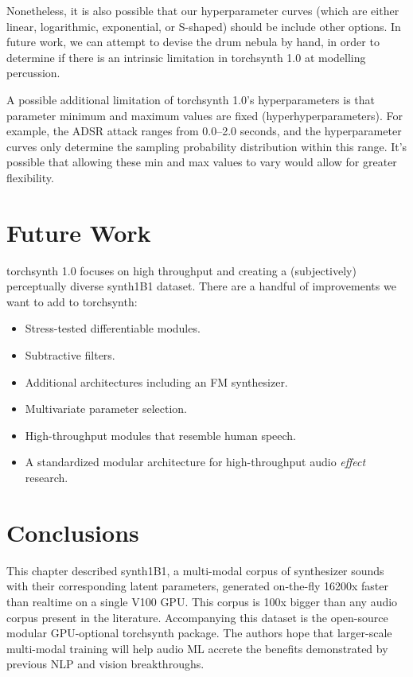 Nonetheless, it is also possible that our hyperparameter curves (which are either linear, logarithmic, exponential, or S-shaped) should be include other options. In future work, we can attempt to devise the drum nebula by hand, in order to determine if there is an intrinsic limitation in torchsynth 1.0 at modelling percussion.

A possible additional limitation of torchsynth 1.0's hyperparameters is that parameter minimum and maximum values are fixed (hyperhyperparameters). For example, the ADSR attack ranges from 0.0--2.0 seconds, and the hyperparameter curves only determine the sampling probability distribution within this range. It's possible that allowing these min and max values to vary would allow for greater flexibility.
\fi

\section{Future Work}

torchsynth 1.0 focuses on high throughput and creating a (subjectively) perceptually diverse synth1B1 dataset. %
There are a handful of improvements we want to add to torchsynth:
\begin{itemize}
\item Stress-tested differentiable modules.
\item Subtractive filters.
\item Additional architectures including an FM synthesizer.
\item Multivariate parameter selection.
\item High-throughput modules that resemble human speech.
\item A standardized modular architecture for high-throughput audio {\em effect} research.
\end{itemize}


\section{Conclusions}

This chapter described synth1B1, a multi-modal corpus of synthesizer sounds with their corresponding latent parameters, generated on-the-fly 16200x faster than realtime on a single V100 GPU. This corpus is 100x bigger than any audio corpus present in the literature. Accompanying this dataset is the open-source modular GPU-optional torchsynth package. The authors hope that larger-scale multi-modal training will help audio ML accrete the benefits demonstrated by previous NLP and vision breakthroughs.

